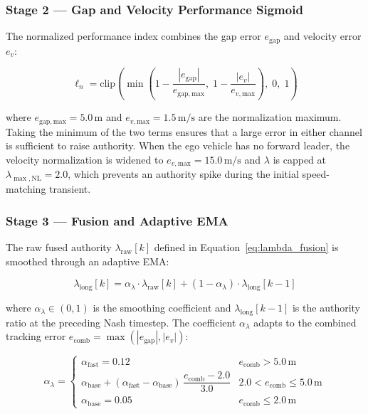 \documentclass[12pt,a4paper,oneside]{report}
\begin{document}
\subsubsection{Stage 2 — Gap and Velocity Performance Sigmoid}

The normalized performance index combines the gap error $e_{\mathrm{gap}}$ and velocity error $e_v$:

\begin{equation}
\ell_n = \mathrm{clip}\!\left(\min\!\left(1 - \frac{|e_{\mathrm{gap}}|}{e_{\mathrm{gap,max}}},\; 1 - \frac{|e_v|}{e_{v,\mathrm{max}}}\right),\; 0,\; 1\right)
\label{eq:ln_long}
\end{equation}

where $e_{\mathrm{gap,max}} = 5.0\,\mathrm{m}$ and $e_{v,\mathrm{max}} = 1.5\,\mathrm{m/s}$ are the normalization maximum. Taking the minimum of the two terms ensures that a large error in either channel is sufficient to raise authority. When the ego vehicle has no forward leader, the velocity normalization is widened to $e_{v,\mathrm{max}} = 15.0\,\mathrm{m/s}$ and $\lambda$ is capped at $\lambda_{\max,\mathrm{NL}} = 2.0$, which prevents an authority spike during the initial speed-matching transient.

\subsubsection{Stage 3 — Fusion and Adaptive EMA}

The raw fused authority $\lambda_{\mathrm{raw}}[k]$ defined in Equation~\ref{eq:lambda_fusion} is smoothed through an adaptive EMA:

\begin{equation}
\lambda_{\mathrm{long}}[k] = \alpha_\lambda \cdot \lambda_{\mathrm{raw}}[k] + (1 - \alpha_\lambda)\cdot\lambda_{\mathrm{long}}[k-1]
\label{eq:long_lambda_ema}
\end{equation}

where $\alpha_\lambda \in (0,1)$ is the smoothing coefficient and $\lambda_{\mathrm{long}}[k-1]$ is the authority ratio at the preceding Nash timestep. The coefficient $\alpha_\lambda$ adapts to the combined tracking error $e_{\mathrm{comb}} = \max(|e_{\mathrm{gap}}|, |e_v|)$:

\begin{equation}
\alpha_\lambda = \begin{cases}
\alpha_{\mathrm{fast}} = 0.12 & e_{\mathrm{comb}} > 5.0\,\mathrm{m} \\[3pt]
\alpha_{\mathrm{base}} + (\alpha_{\mathrm{fast}} - \alpha_{\mathrm{base}})\,\dfrac{e_{\mathrm{comb}} - 2.0}{3.0} & 2.0 < e_{\mathrm{comb}} \leq 5.0\,\mathrm{m} \\[3pt]
\alpha_{\mathrm{base}} = 0.05 & e_{\mathrm{comb}} \leq 2.0\,\mathrm{m}
\end{cases}
\label{eq:long_alpha_adaptive}
\end{equation}
\end{document}
